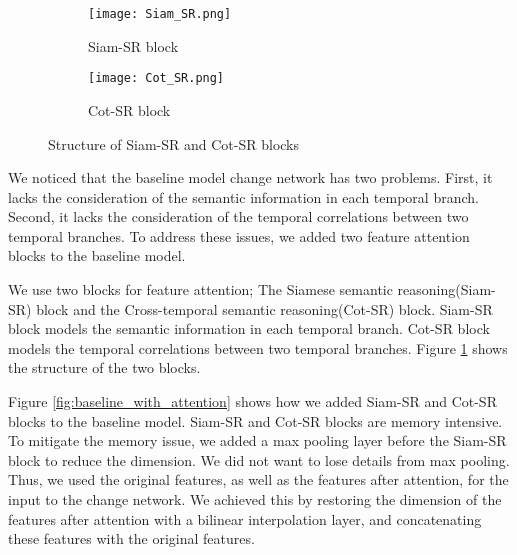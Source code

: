 \documentclass[../main.tex]{subfiles}
\begin{document}
\begin{figure}[h]
    \centering
    \begin{subfigure}[b]{0.21\linewidth}
        \texttt{[image: Siam\_SR.png]}
        \caption{Siam-SR block}
    \end{subfigure}
    \hspace{0.1\textwidth}
    \begin{subfigure}[b]{0.4\linewidth}
        \texttt{[image: Cot\_SR.png]}
        \caption{Cot-SR block}
    \end{subfigure}
    \caption{Structure of Siam-SR and Cot-SR blocks\cite{Ding_2022_Bi_SRNet}}
    \label{fig:attention_blocks}
\end{figure}

We noticed that the baseline model change network has two problems. First, it lacks the consideration of the semantic information in each temporal branch. Second, it lacks the consideration of the temporal correlations between two temporal branches. To address these issues, we added two feature attention blocks to the baseline model.

We use two blocks for feature attention; The Siamese semantic reasoning(Siam-SR) block and the Cross-temporal semantic reasoning(Cot-SR) block. Siam-SR block models the semantic information in each temporal branch. Cot-SR block models the temporal correlations between two temporal branches\cite{Ding_2022_Bi_SRNet}. Figure \ref{fig:attention_blocks} shows the structure of the two blocks.

Figure \ref{fig:baseline_with_attention} shows how we added Siam-SR and Cot-SR blocks to the baseline model. Siam-SR and Cot-SR blocks are memory intensive. To mitigate the memory issue, we added a max pooling layer before the Siam-SR block to reduce the dimension. We did not want to lose details from max pooling. Thus, we used the original features, as well as the features after attention, for the input to the change network. We achieved this by restoring the dimension of the features after attention with a bilinear interpolation layer, and concatenating these features with the original features.
\end{document}
